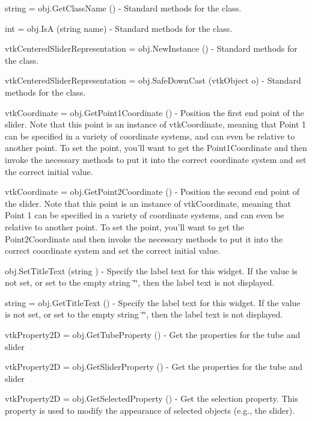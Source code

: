 \begin{DoxyItemize}
\item {\ttfamily string = obj.\-Get\-Class\-Name ()} -\/ Standard methods for the class.  
\item {\ttfamily int = obj.\-Is\-A (string name)} -\/ Standard methods for the class.  
\item {\ttfamily vtk\-Centered\-Slider\-Representation = obj.\-New\-Instance ()} -\/ Standard methods for the class.  
\item {\ttfamily vtk\-Centered\-Slider\-Representation = obj.\-Safe\-Down\-Cast (vtk\-Object o)} -\/ Standard methods for the class.  
\item {\ttfamily vtk\-Coordinate = obj.\-Get\-Point1\-Coordinate ()} -\/ Position the first end point of the slider. Note that this point is an instance of vtk\-Coordinate, meaning that Point 1 can be specified in a variety of coordinate systems, and can even be relative to another point. To set the point, you'll want to get the Point1\-Coordinate and then invoke the necessary methods to put it into the correct coordinate system and set the correct initial value.  
\item {\ttfamily vtk\-Coordinate = obj.\-Get\-Point2\-Coordinate ()} -\/ Position the second end point of the slider. Note that this point is an instance of vtk\-Coordinate, meaning that Point 1 can be specified in a variety of coordinate systems, and can even be relative to another point. To set the point, you'll want to get the Point2\-Coordinate and then invoke the necessary methods to put it into the correct coordinate system and set the correct initial value.  
\item {\ttfamily obj.\-Set\-Title\-Text (string )} -\/ Specify the label text for this widget. If the value is not set, or set to the empty string \char`\"{}\char`\"{}, then the label text is not displayed.  
\item {\ttfamily string = obj.\-Get\-Title\-Text ()} -\/ Specify the label text for this widget. If the value is not set, or set to the empty string \char`\"{}\char`\"{}, then the label text is not displayed.  
\item {\ttfamily vtk\-Property2\-D = obj.\-Get\-Tube\-Property ()} -\/ Get the properties for the tube and slider  
\item {\ttfamily vtk\-Property2\-D = obj.\-Get\-Slider\-Property ()} -\/ Get the properties for the tube and slider  
\item {\ttfamily vtk\-Property2\-D = obj.\-Get\-Selected\-Property ()} -\/ Get the selection property. This property is used to modify the appearance of selected objects (e.\-g., the slider).  

\end{DoxyItemize}
